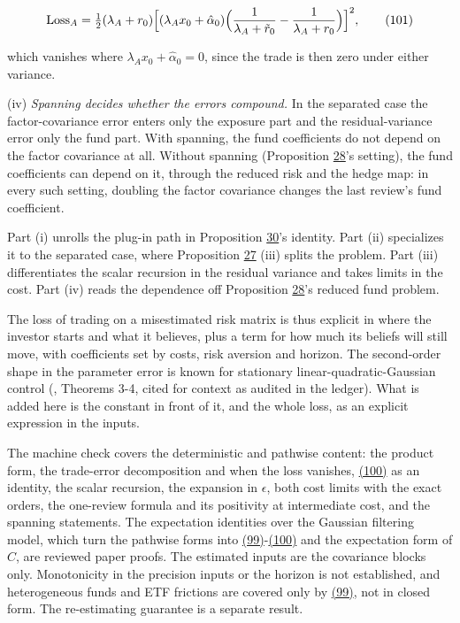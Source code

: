 \documentclass[11pt]{article}
\begin{document}
\begin{equation*}
\mathrm{Loss}_A=\tfrac12(\lambda_A+r_0)\Bigl[(\lambda_Ax_0+\hat\alpha_0)
 \Bigl(\frac1{\lambda_A+\tilde r_0}-\frac1{\lambda_A+r_0}\Bigr)\Bigr]^2,\tag{101}\label{eq:101}
\end{equation*}

which vanishes where \(\lambda_Ax_0+\hat\alpha_0=0\), since the trade is then
zero under either variance.

(iv) \emph{Spanning decides whether the errors compound.} In the separated
case the factor-covariance error enters only the exposure part and the
residual-variance error only the fund part. With spanning, the fund
coefficients do not depend on the factor covariance at all. Without
spanning (Proposition \hyperref[res:Proposition-28]{28}'s setting), the fund coefficients can depend
on it, through the reduced risk and the hedge map: in every such
setting, doubling the factor covariance changes the last review's
fund coefficient.

Part (i) unrolls the plug-in path in Proposition \hyperref[res:Proposition-30]{30}'s identity. Part
(ii) specializes it to the separated case, where Proposition \hyperref[res:Proposition-27]{27} (iii)
splits the problem. Part (iii) differentiates the scalar recursion in
the residual variance and takes limits in the cost. Part (iv) reads
the dependence off Proposition \hyperref[res:Proposition-28]{28}'s reduced fund problem.

The loss of trading on a misestimated risk matrix is thus explicit in
where the investor starts and what it believes, plus a term for how
much its beliefs will still move, with coefficients set by costs, risk
aversion and horizon. The second-order shape in the parameter error is
known for stationary linear-quadratic-Gaussian control
(\cite{mania2019certainty}, Theorems 3-4, cited for context as audited in
the ledger). What is added here is the constant in front of it, and
the whole loss, as an explicit expression in the inputs.

The machine check covers the deterministic and pathwise content: the
product form, the trade-error decomposition and when the loss
vanishes, \hyperref[eq:100]{(100)} as an identity, the scalar recursion, the expansion
in \(\epsilon\), both cost limits with the exact orders, the one-review formula
and its positivity at intermediate cost, and the spanning statements.
The expectation identities over the Gaussian filtering model, which
turn the pathwise forms into \hyperref[eq:99]{(99)}-\hyperref[eq:100]{(100)} and the expectation form of
\(C\), are reviewed paper proofs. The estimated inputs are the
covariance blocks only. Monotonicity in the precision inputs or the
horizon is not established, and heterogeneous funds and ETF
frictions are covered only by \hyperref[eq:99]{(99)}, not in closed form. The
re-estimating guarantee is a separate result.
\end{document}
